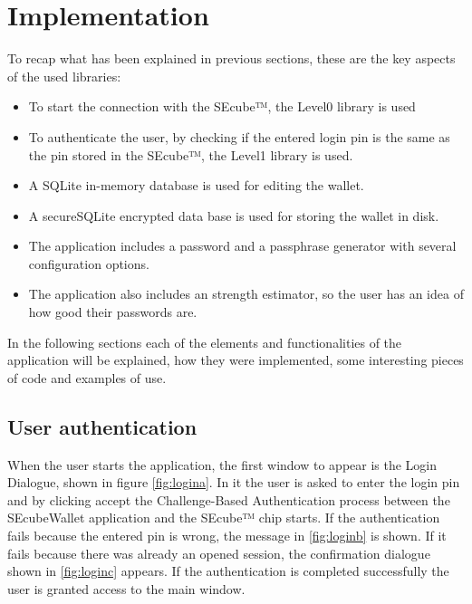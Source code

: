 \section{Implementation} \label{sec:imp}

To recap what has been explained in previous sections, these are the key aspects of the used libraries:

\begin{itemize}
\setlength\itemsep{0pt}

\item To start the connection with the SEcube™, the Level0 library is used
\item To authenticate the user, by checking if the entered login pin is the same as the pin stored in the SEcube™, the Level1 library is used.
\item A SQLite in-memory database is used for editing the wallet.
\item A secureSQLite encrypted data base is used for storing the wallet in disk.
\item The application includes a password and a passphrase generator with several configuration options.
\item The application also includes an strength estimator, so the user has an idea of how good their passwords are.

\end{itemize}

In the following sections each of the elements and functionalities of the application will be explained, how they were implemented, some interesting pieces of code and examples of use.

\subsection{User authentication} \label{sec:authen}

When the user starts the application, the first window to appear is the Login Dialogue, shown in figure \ref{fig:logina}. In it the user is asked to enter the login pin and by clicking accept the Challenge-Based Authentication process between the SEcubeWallet application and the SEcube™ chip starts. If the authentication fails because the entered pin is wrong, the message in \ref{fig:loginb} is shown. If it fails because there was already an opened session, the confirmation dialogue shown in \ref{fig:loginc} appears. If the authentication is completed successfully the user is granted access to the main window.

